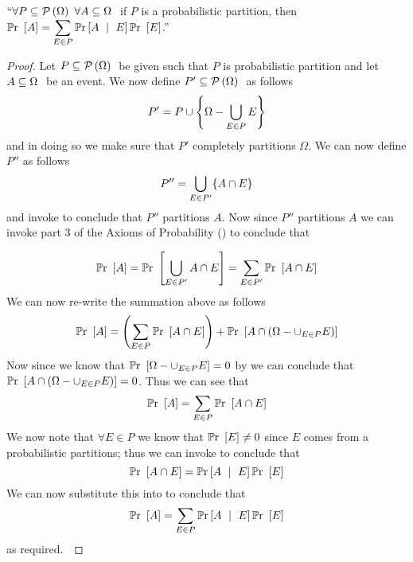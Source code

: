         \begin{theorem}
            $``\forall P \subseteq \mathcal{P}\left(\Omega\right) \  \forall A \subseteq \Omega \ $
            if $P$ is a probabilistic partition, then $\mathbb{P}\mathrm{r}~\left[A\right] = \displaystyle\sum_{E \in P} \mathbb{P}\mathrm{r}\left[A~\mid~E\right] \mathbb{P}\mathrm{r}~\left[E\right]$.''
            \label{The Law of Total Probability}
        \end{theorem}
        \begin{proof}
            Let $P \subseteq \mathcal{P}\left(\Omega\right) \ $ be given such that $P$ is probabilistic partition
            and let $A \subseteq \Omega \ $ be an event. We now define $P' \subseteq \mathcal{P}\left(\Omega\right) \ $
            as follows
            \[
                P' = P \cup \left\{\Omega - \displaystyle\bigcup_{E \in P} E\right\}
            \]
            and in doing so we make sure that $P'$ completely partitions $\Omega$. We
            can now define $P''$ as follows
            \[
                P'' = \displaystyle\bigcup_{E \in P'} \{A \cap E\}
            \]
            and invoke  to conclude that $P''$ partitions $A$.
            Now since $P''$ partitions $A$ we can invoke part 3 of the Axioms of Probability
            () to conclude that

            \[
                \mathbb{P}\mathrm{r}~\left[A\right] = \mathbb{P}\mathrm{r}~\left[\displaystyle\bigcup_{E \in P'} A \cap E\right] = \sum_{E \in P'} \mathbb{P}\mathrm{r}~\left[A \cap E\right]
            \]
            We can now re-write the summation above as follows
            \[
                \mathbb{P}\mathrm{r}~\left[A\right] = \left(\sum_{E \in P} \mathbb{P}\mathrm{r}~\left[A \cap E\right]\right) + \mathbb{P}\mathrm{r}~\left[A \cap \left(\Omega - \cup_{E \in P} E\right)\right]
            \]
            Now since we know that $\mathbb{P}\mathrm{r}~\left[\Omega - \cup_{E \in P} E\right] = 0$ by 
            we can conclude that $\mathbb{P}\mathrm{r}~\left[A \cap \left(\Omega - \cup_{E \in P} E\right)\right] = 0$. Thus
            we can see that
            \begin{equation}
                \mathbb{P}\mathrm{r}~\left[A\right] = \sum_{E \in P} \mathbb{P}\mathrm{r}~\left[A \cap E\right]
                \label{LTP equation 1}
            \end{equation}
            We now note that $\forall E \in P$ we know that $\mathbb{P}\mathrm{r}~\left[E\right] \neq 0$ since $E$ comes
            from a probabilistic partitions; thus we can invoke 
            to conclude that
            \[
                \mathbb{P}\mathrm{r}~\left[A \cap E\right] = \mathbb{P}\mathrm{r}\left[A~\mid~E\right] \mathbb{P}\mathrm{r}~\left[E\right]
            \]
            We can now substitute this into 
            to conclude that 
            \[
                \mathbb{P}\mathrm{r}~\left[A\right] = \sum_{E \in P} \mathbb{P}\mathrm{r}\left[A~\mid~E\right] \mathbb{P}\mathrm{r}~\left[E\right]
            \]
            as required.~\QED
        \end{proof}
